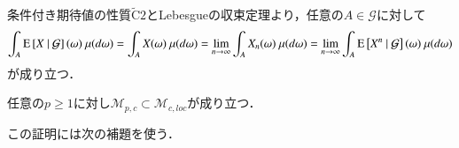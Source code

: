 	\begin{prf}
		条件付き期待値の性質$\tilde{\mathrm{C}}2$とLebesgueの収束定理より，任意の$A \in \mathcal{G}$に対して
		\begin{align}
			\int_A \operatorname{E} \left[ X \ \middle|\ \mathcal{G} \right](\omega)\ \mu(d\omega)
			= \int_A X(\omega)\ \mu(d\omega) = \lim_{n \to \infty} \int_A X_n(\omega)\ \mu(d\omega)
			= \lim_{n \to \infty} \int_A \operatorname{E} \left[ X^n \ \middle|\ \mathcal{G} \right](\omega)\ \mu(d\omega)
		\end{align}
		が成り立つ．
		\QED
	\end{prf}
	
	\begin{itembox}[l]{}
		\begin{prp}
			任意の$p \geq 1$に対し$\mathcal{M}_{p,c} \subset \mathcal{M}_{c,loc}$が成り立つ．
			\label{prp:M_pc_M_cloc}
		\end{prp}
	\end{itembox}
	この証明には次の補題を使う．
	
